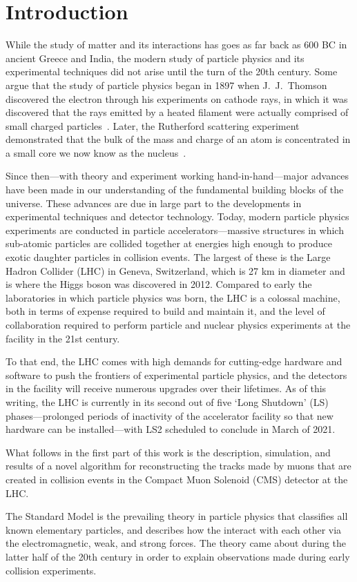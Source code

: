 
\chapter{Introduction}
While the study of matter and its interactions has goes as far back as 600 BC in ancient Greece and India, the modern study of particle physics and its experimental techniques did not arise until the turn of the 20th century.
Some argue that the study of particle physics began in 1897 when J.\ J.\ Thomson discovered the electron through his experiments on cathode rays, in which it was discovered that the rays emitted by a heated filament were actually comprised of small charged particles~\cite{GriffithsParticle}.
Later, the Rutherford scattering experiment demonstrated that the bulk of the mass and charge of an atom is concentrated in a small core we now know as the nucleus~\cite{BargerCollider}.

Since then---with theory and experiment working hand-in-hand---major advances have been made in our understanding of the fundamental building blocks of the universe.
These advances are due in large part to the developments in experimental techniques and detector technology.
Today, modern particle physics experiments are conducted in particle accelerators---massive structures in which sub-atomic particles are collided together at energies high enough to produce exotic daughter particles in collision events.
The largest of these is the Large Hadron Collider (LHC) in Geneva, Switzerland, which is 27 km in diameter and is where the Higgs boson was discovered in 2012.
Compared to early the laboratories in which particle physics was born, the LHC is a colossal machine, both in terms of expense required to build and maintain it, and the level of collaboration required to perform particle and nuclear physics experiments at the facility in the 21st century.

To that end, the LHC comes with high demands for cutting-edge hardware and software to push the frontiers of experimental particle physics, and the detectors in the facility will receive numerous upgrades over their lifetimes.
As of this writing, the LHC is currently in its second out of five `Long Shutdown' (LS) phases---prolonged periods of inactivity of the accelerator facility so that new hardware can be installed---with LS2 scheduled to conclude in March of 2021.

What follows in the first part of this work is the description, simulation, and results of a novel algorithm for reconstructing the tracks made by muons that are created in collision events in the Compact Muon Solenoid (CMS) detector at the LHC.

The Standard Model is the prevailing theory in particle physics that classifies all known elementary particles, and describes how the interact with each other via the electromagnetic, weak, and strong forces.
The theory came about during the latter half of the 20th century in order to explain observations made during early collision experiments.
